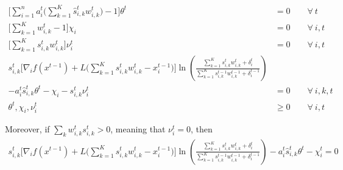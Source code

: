 \begin{align*}
   \biggl[ \sum_{i=1}^{n} a_{i}^{t} \biggl( \sum_{k=1}^{K}  \hat{s}_{i,k}^{t} w_{i,k}^{t} \biggr) - 1 \biggr] \theta^{t} &= 0 \qquad \forall \ t \\
   \biggl[ \sum_{k=1}^{K}  w_{i,k}^{t}  - 1 \biggr] \chi_{i} &= 0 \qquad \forall\ i, t \\
   \biggl[ \sum_{k=1}^{K}  s_{i,k}^{t} w_{i,k}^{t} \biggr] \nu_{i}^{t} &= 0 \qquad \forall\ i, t \\
%
 s_{i,k}^{t} \biggl[  \nabla_{i} f(x^{t-1}) + L\biggl( \sum_{k=1}^{K} s_{i,k}^{t} w_{i,k}^{t} - x_{i}^{t-1} \biggr) \biggr] \ln \left( \frac{\sum_{k=1}^{K} s_{i,k}^{t} w_{i,k}^{t} + \delta_{i}^{t}}{\sum_{k=1}^{K}  s_{i,k}^{t-1}w_{i,k}^{t-1}  + \delta_{i}^{t-1}} \right) \\
        - a_{i}^{t} \hat{s}_{i,k}^{t} \theta^{t} - \chi_{i} - s_{i,k}^{t} \nu_{i}^{t} &= 0	\qquad \forall\ i,k,t \\
    \theta^{t}, \chi_{i}, \nu_{i}^{t} &\geq 0 \qquad \forall\ i, t
\end{align*}

Moreover, if $\sum_{k} w_{i,k}^{t} s_{i,k}^{t} > 0$, meaning that $\nu_{i}^{t} = 0$, then
\begin{align}	\label{eq:KKT2}
 s_{i,k}^{t} \biggl[  \nabla_{i} f(x^{t-1}) + L\biggl( \sum_{k=1}^{K} s_{i,k}^{t} w_{i,k}^{t}  - x_{i}^{t-1} \biggr) \biggr] \ln \left( \frac{\sum_{k=1}^{K} s_{i,k}^{t} w_{i,k}^{t} + \delta_{i}^{t}}{\sum_{k=1}^{K}  s_{i,k}^{t-1}w_{i,k}^{t-1}  + \delta_{i}^{t-1}} \right)
        - a_{i}^{t} \hat{s}_{i,k}^{t} \theta^{t} - \chi_{i}^{t} = 0
\end{align}

\clearpage

